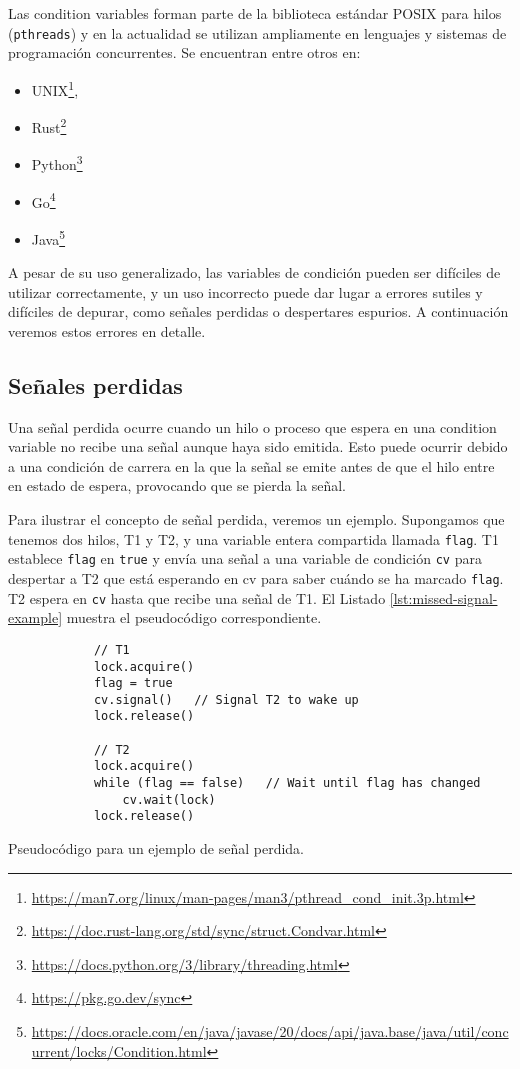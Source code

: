 Las condition variables forman parte de la biblioteca estándar POSIX para hilos (\texttt{pthreads}) \cite{nichols1996pthreads}
y en la actualidad se utilizan ampliamente en lenguajes y sistemas de programación
concurrentes. Se encuentran entre otros en:

\begin{itemize}
      \item UNIX\footnote{\url{https://man7.org/linux/man-pages/man3/pthread_cond_init.3p.html}},
      \item Rust\footnote{\url{https://doc.rust-lang.org/std/sync/struct.Condvar.html}}
      \item Python\footnote{\url{https://docs.python.org/3/library/threading.html}}
      \item Go\footnote{\url{https://pkg.go.dev/sync}}
      \item Java\footnote{
                  \url{https://docs.oracle.com/en/java/javase/20/docs/api/java.base/java/util/concurrent/locks/Condition.html}}
\end{itemize}

A pesar de su uso generalizado, las variables de condición pueden ser difíciles de utilizar
correctamente, y un uso incorrecto puede dar lugar a errores sutiles y difíciles de depurar, como
señales perdidas o despertares espurios. A continuación veremos estos errores en detalle.

\subsection{Señales perdidas}

Una señal perdida ocurre cuando un hilo o proceso que espera en una condition variable no
recibe una señal aunque haya sido emitida. Esto puede ocurrir debido a una condición de
carrera en la que la señal se emite antes de que el hilo entre en estado de espera, provocando
que se pierda la señal.

Para ilustrar el concepto de señal perdida, veremos un ejemplo. Supongamos que tenemos
dos hilos, T1 y T2, y una variable entera compartida llamada \texttt{flag}. T1 establece \texttt{flag} en \texttt{true}
y envía una señal a una variable de condición \texttt{cv} para despertar a T2 que está esperando en
cv para saber cuándo se ha marcado \texttt{flag}. T2 espera en \texttt{cv} hasta que recibe una señal de
T1. El Listado \ref{lst:missed-signal-example} muestra el pseudocódigo correspondiente.

\begin{listing}[!htb]
      \begin{verbatim}
            // T1
            lock.acquire()
            flag = true
            cv.signal()   // Signal T2 to wake up
            lock.release()
            
            // T2
            lock.acquire()
            while (flag == false)   // Wait until flag has changed
                cv.wait(lock)
            lock.release()
      \end{verbatim}
      \caption{Pseudocódigo para un ejemplo de señal perdida.}
      \label{lst:missed-signal-example}
\end{listing}

